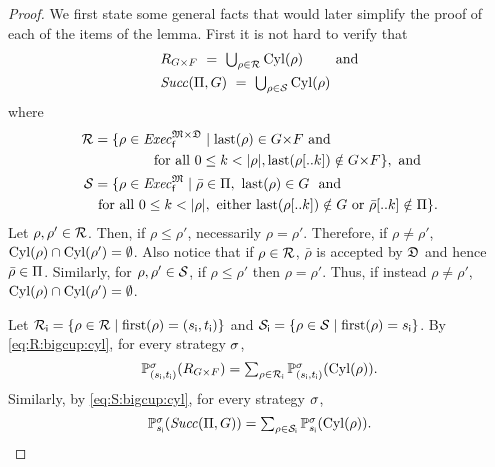 \begin{proof}
  We first state some general facts that would later simplify the
  proof of each of the items of the lemma.
  First it is not hard to verify that
  \begin{align}
    & \textstyle
    R_{G{\times}F} \ = \ \bigcup_{\rho\in\mathcal{R}}\mathrm{Cyl}(\rho) \qquad\text{ and}\label{eq:R:bigcup:cyl}\\
    & \textstyle
    \mathit{Succ}(\Pi,G) \ = \ \bigcup_{\rho\in\mathcal{S}}\mathrm{Cyl}(\rho) \label{eq:S:bigcup:cyl}
  \end{align}
  where
  \begin{align*}
    \mathcal{R} = {}
    & \{{\rho\in\mathit{Exec}_{\mathsf{f}}^{{\mathfrak{M}}{\times}{\mathfrak{D}}}} \mid \mathrm{last}(\rho)\in{G{\times}F}\text{ and}\\
    & \qquad\quad\text{for all }0\leq k<{|}{\rho}{|},\mathrm{last}(\rho[..k])\notin{G{\times}F}\}, \text{ and } \\
    \mathcal{S} = {}
    & \{{\rho\in\mathit{Exec}_{\mathsf{f}}^{{\mathfrak{M}}}} \mid {\bar{\rho}\in\Pi}, \ {\mathrm{last}(\rho)\in G} \ \text{ and}\\
    & \!\!\!\!\!\! \text{for all }0\leq k<{|}{\rho}{|}, \text{ either }{\mathrm{last}(\rho[..k])\notin G}\text{ or }{\bar{\rho}[..k]\notin\Pi}\}.
  \end{align*}
  Let $\rho,\rho'\in\mathcal{R}$.  Then, if $\rho\leq\rho'$,
  necessarily $\rho=\rho'$.  Therefore, if $\rho\neq\rho'$,
  $\mathrm{Cyl}(\rho)\cap\mathrm{Cyl}(\rho')=\emptyset$.  Also notice that if
  $\rho\in\mathcal{R}$, $\bar{\rho}$ is accepted by ${\mathfrak{D}}$ and hence
  $\bar{\rho}\in\Pi$.
  Similarly, for $\rho,\rho'\in\mathcal{S}$, if $\rho\leq\rho'$ then
  $\rho=\rho'$.  Thus, if instead $\rho\neq\rho'$,
  $\mathrm{Cyl}(\rho)\cap\mathrm{Cyl}(\rho')=\emptyset$.

  Let
  $\mathcal{R}_{\mathsf{i}}=\{{\rho\in\mathcal{R}}\mid{\mathrm{first}(\rho)=({s_{\textsf{i}}},{t_{\textsf{i}}})}\}$
  and
  $\mathcal{S}_{\mathsf{i}}=\{{\rho\in\mathcal{S}}\mid{\mathrm{first}(\rho)={s_{\textsf{i}}}}\}$.
  By \cref{eq:R:bigcup:cyl}, for every strategy $\sigma$,
  \begin{equation}\label{eq:prob:R:bigcup:cyl}
    \textstyle
    \mathbb{P}^{\sigma}_{({s_{\textsf{i}}},{t_{\textsf{i}}})}(R_{G{\times}F}) =
    \sum_{\rho\in\mathcal{R}_{\mathsf{i}}}\mathbb{P}^{\sigma}_{({s_{\textsf{i}}},{t_{\textsf{i}}})}(\mathrm{Cyl}(\rho)).
  \end{equation}
  Similarly, by \cref{eq:S:bigcup:cyl}, for every strategy $\sigma$,
  \begin{equation}\label{eq:prob:S:bigcup:cyl}
    \textstyle
    \mathbb{P}^{\sigma}_{{s_{\textsf{i}}}}(\mathit{Succ}(\Pi,G)) =
    \sum_{\rho\in\mathcal{S}_{\mathsf{i}}}\mathbb{P}^{\sigma}_{{s_{\textsf{i}}}}(\mathrm{Cyl}(\rho)).
  \end{equation}


\end{proof}
